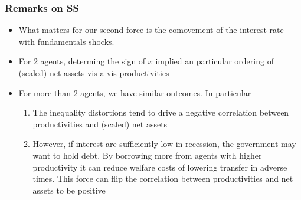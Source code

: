\documentclass{beamer}
\begin{document}
\begin{frame}
 \frametitle{Remarks on SS}
 \begin{itemize}
 \item  What matters for our second force is the comovement of the interest rate with fundamentals shocks. 
\item For 2 agents, determing the sign of $x$ implied an particular ordering of (scaled) net assets vis-a-vis productivities
 \item For more than 2 agents, we have similar outcomes. In particular
  \begin{enumerate}
   \item The inequality distortions tend to drive a negative correlation between productivities and (scaled) net assets
   \item However, if interest are sufficiently low in recession, the government may want to hold debt. By borrowing more from agents with higher productivity it can reduce welfare costs of lowering transfer in adverse times. 
   This force can flip the correlation between productivities and net assets to be positive
  \end{enumerate}  
\end{itemize}


\end{frame}

%
%
%
%
\end{document}
